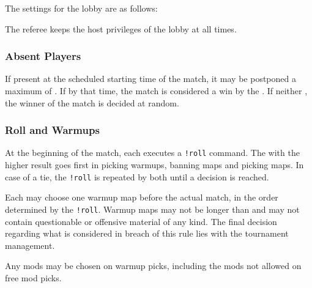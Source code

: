 \begin{samepage}
The settings for the lobby are as follows:


\end{samepage}

The referee keeps the host privileges of the lobby at all times.

\subsubsection{Absent Players}
If  present at the scheduled starting time of the match, it may be postponed a maximum of \maxlate.
If  by that time, the match is considered a win by the .
If neither , the winner of the match is decided at random.

\subsubsection{Roll and Warmups}
\label{sec:warmup}
At the beginning of the match, each  executes a \texttt{!roll} command. The  with the higher result goes first in picking warmups, banning maps and picking maps. In case of a tie, the \texttt{!roll} is repeated by both  until a decision is reached.

Each  may choose one warmup map before the actual match, in the order determined by the \texttt{!roll}.  Warmup maps may not be longer than \maxwarmup{} and may not contain questionable or offensive material of any kind. The final decision regarding what is considered in breach of this rule lies with the tournament management.

Any mods may be chosen on warmup picks, including the mods not allowed on free mod picks.

